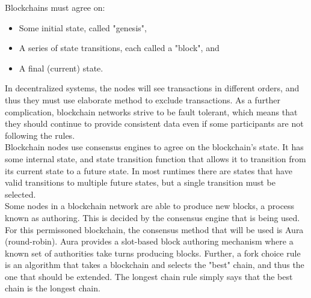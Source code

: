 Blockchains must agree on:

\begin{itemize}
	\item Some initial state, called "genesis", 
	\item A series of state transitions, each called a "block", and
	\item A final (current) state.
\end{itemize}

In decentralized systems, the nodes will see transactions in different orders, and thus they must use elaborate method to exclude transactions. As a further complication, blockchain networks strive to be fault tolerant, which means that they should continue to provide consistent data even if some participants are not following the rules. \\

Blockchain nodes use consensus engines to agree on the blockchain's state. It has some internal state, and state transition function that allows it to transition from its current state to a future state. In most runtimes there are states that have valid transitions to multiple future states, but a single transition must be selected. \\

Some nodes in a blockchain network are able to produce new blocks, a process known as authoring. This is decided by the consensus engine that is being used. For this permissoned blockchain, the consensus method that will be used is Aura (round-robin). Aura provides a slot-based block authoring mechanism where a known set of authorities take turns producing blocks. Further, a fork choice rule is an algorithm that takes a blockchain and selects the "best" chain, and thus the one that should be extended. The longest chain rule simply says that the best chain is the longest chain. \\

